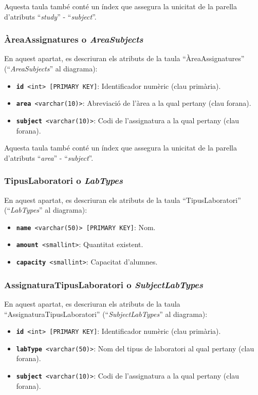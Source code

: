 \documentclass[a4paper,12pt]{ThesisStyle}
\begin{document}
Aquesta taula també conté un índex que assegura la unicitat de la parella d'atributs ``\textit{study}'' - ``\textit{subject}''.

\subsubsection{ÀreaAssignatures o \textit{AreaSubjects}}

En aquest apartat, es descriuran els atributs de la taula ``ÀreaAssignatures'' (``\textit{AreaSubjects}'' al diagrama):
\begin{itemize}
  \item \texttt{\textbf{id} <int> [PRIMARY KEY]}: Identificador numèric (clau primària).
  \item \texttt{\textbf{area} <varchar(10)>}: Abreviació de l'àrea a la qual pertany (clau forana).
  \item \texttt{\textbf{subject} <varchar(10)>}: Codi de l'assignatura a la qual pertany (clau forana).
\end{itemize}

Aquesta taula també conté un índex que assegura la unicitat de la parella d'atributs ``\textit{area}'' - ``\textit{subject}''.

\subsubsection{TipusLaboratori o \textit{LabTypes}}

En aquest apartat, es descriuran els atributs de la taula ``TipusLaboratori'' (``\textit{LabTypes}'' al diagrama):
\begin{itemize}
  \item \texttt{\textbf{name} <varchar(50)> [PRIMARY KEY]}: Nom.
  \item \texttt{\textbf{amount} <smallint>}: Quantitat existent.
  \item \texttt{\textbf{capacity} <smallint>}: Capacitat d'alumnes.
\end{itemize}

\subsubsection{AssignaturaTipusLaboratori o \textit{SubjectLabTypes}}

En aquest apartat, es descriuran els atributs de la taula ``AssignaturaTipusLaboratori'' (``\textit{SubjectLabTypes}'' al diagrama):
\begin{itemize}
  \item \texttt{\textbf{id} <int> [PRIMARY KEY]}: Identificador numèric (clau primària).
  \item \texttt{\textbf{labType} <varchar(50)>}: Nom del tipus de laboratori al qual pertany (clau forana).
  \item \texttt{\textbf{subject} <varchar(10)>}: Codi de l'assignatura a la qual pertany (clau forana).
\end{itemize}
\end{document}
